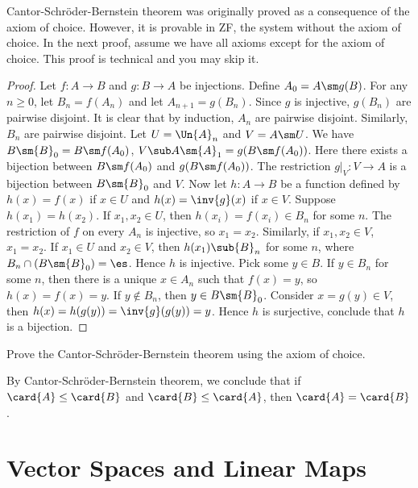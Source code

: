 \documentclass[10pt]{article}
\begin{document}
\begin{remark}
    Cantor-Schröder-Bernstein theorem was originally proved as a consequence of the axiom of choice. However, it is provable in ZF, the system without the axiom of choice. In the next proof, assume we have all axioms except for the axiom of choice. This proof is technical and you may skip it.
\end{remark}
\begin{proof}
    Let $f:A\to B$ and $g:B\to A$ be injections. Define ${A}_{0}=A\sm g(B)$. For any $n\ge 0$, let ${B}_{n}=f({A}_{n})$ and let ${A}_{n+1}=g({B}_{n})$. Since $g$ is injective, $g({B}_{n})$ are pairwise disjoint. It is clear that by induction, ${A}_{n}$ are pairwise disjoint. Similarly, ${B}_{n}$ are pairwise disjoint. Let $U=\Un{A}_{n}$ and $V=A\sm U$. We have $B\sm{B}_{0}=B\sm f({A}_{0})$, $V\sub A\sm{A}_{1}=g(B\sm f({A}_{0}))$. Here there exists a bijection between $B\sm f({A}_{0})$ and $g(B\sm f({A}_{0}))$. The restriction $g{\vert}_{V}:V\to A$ is a bijection between $B\sm{B}_{0}$ and $V$. Now let $h:A\to B$ be a function defined by $h(x)=f(x)$ if $x\in U$ and $h(x)=\inv{g}(x)$ if $x\in V$. Suppose $h({x}_{1})=h({x}_{2})$. If ${x}_{1},{x}_{2}\in U$, then $h({x}_{i})=f({x}_{i})\in{B}_{n}$ for some $n$. The restriction of $f$ on every ${A}_{n}$ is injective, so ${x}_{1}={x}_{2}$. Similarly, if ${x}_{1},{x}_{2}\in V$, ${x}_{1}={x}_{2}$. If ${x}_{1}\in U$ and ${x}_{2}\in V$, then $h({x}_{1})\sub{B}_{n}$ for some $n$, where ${B}_{n}\cap(B\sm{B}_{0})=\es$. Hence $h$ is injective. Pick some $y\in B$. If $y\in{B}_{n}$ for some $n$, then there is a unique $x\in{A}_{n}$ such that $f(x)=y$, so $h(x)=f(x)=y$. If $y\notin{B}_{n}$, then $y\in B\sm{B}_{0}$. Consider $x=g(y)\in V$, then $h(x)=h(g(y))=\inv{g}(g(y))=y$. Hence $h$ is surjective, conclude that $h$ is a bijection.
\end{proof}
\begin{problem}
    Prove the Cantor-Schröder-Bernstein theorem using the axiom of choice.
\end{problem}
\par
By Cantor-Schröder-Bernstein theorem, we conclude that if $\card{A}\le\card{B}$ and $\card{B}\le\card{A}$, then $\card{A}=\card{B}$.
\newpage
\section{Vector Spaces and Linear Maps}

\newpage

 
\end{document}
